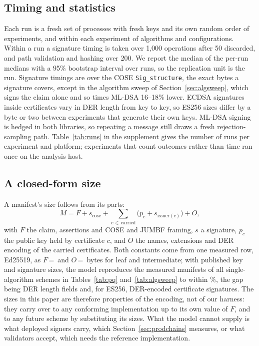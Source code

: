 \subsection{Timing and statistics}
\label{sec:timing}

Each run is a fresh set of processes with fresh keys and its own random order
of experiments, and within each experiment of algorithms and configurations.
Within a run a signature timing is taken over 1,000 operations after 50
discarded, and path validation and hashing over 200. We report the median of
the per-run medians with a 95\% bootstrap interval over runs, so the
replication unit is the run. Signature timings are over the COSE
\texttt{Sig\_structure}, the exact bytes a signature covers, except in the
algorithm sweep of Section~\ref{sec:algsweep}, which signs the claim alone and
so times ML-DSA 16--18\% lower. ECDSA signatures inside certificates
vary in DER length from key to key, so ES256 sizes differ by a byte or two
between experiments that generate their own keys. ML-DSA signing is
hedged in both libraries, so repeating a message still draws a fresh
rejection-sampling path. Table~\ref{tab:runs} in the supplement gives the number
of runs per experiment and platform; experiments that count outcomes rather than time ran
once on the analysis host.


\subsection{A closed-form size}
\label{sec:sizemodel}

A manifest's size follows from its parts:
\begin{equation}
M = F + s_{\mathrm{cose}} + \sum_{c\,\in\,\text{carried}} \bigl(p_c + s_{\mathrm{issuer}(c)}\bigr) + O,
\label{eq:size}
\end{equation}
with $F$ the claim, assertions and COSE and JUMBF framing, $s$ a signature,
$p_c$ the public key held by certificate $c$, and $O$ the names, extensions
and DER encoding of the carried certificates. Both constants come from one
measured row, Ed25519, as $F$\,=\,\NmodelF{} and $O$\,=\,\NmodelO{} bytes for leaf and
intermediate; with published key and signature sizes, the model reproduces the
measured manifests of all \NmodelN{} single-algorithm schemes in
Tables~\ref{tab:pq} and~\ref{tab:algsweep} to within \NmodelErrMax\%, the gap
being DER length fields and, for ES256, DER-encoded certificate signatures. The sizes in this paper are therefore properties of the encoding, not
of our harness: they carry over to any conforming implementation up to its own
value of $F$, and to any future scheme by substituting its sizes. What the
model cannot supply is what deployed signers carry, which
Section~\ref{sec:prodchains} measures, or what validators accept, which needs
the reference implementation.

